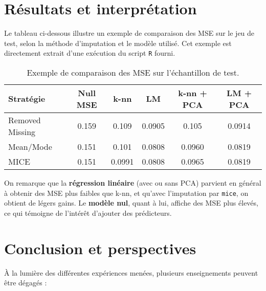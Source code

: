 \documentclass[11pt]{article}
\begin{document}
	
	\section{Résultats et interprétation}
	Le tableau ci-dessous illustre un exemple de comparaison des MSE sur le jeu de test, selon la méthode d'imputation et le modèle utilisé. Cet exemple est directement extrait d'une exécution du script \texttt{R} fourni.
	
	\begin{table}[H]
		\centering
		\begin{tabular}{@{}lccccc@{}}
			\toprule
			\textbf{Stratégie} & \textbf{Null MSE} & \textbf{k-nn} & \textbf{LM} & \textbf{k-nn + PCA} & \textbf{LM + PCA}\\
			\midrule
			Removed Missing  & 0.159 & 0.109 & 0.0905 & 0.105 & 0.0914 \\
			Mean/Mode        & 0.151 & 0.101 & 0.0808 & 0.0960 & 0.0819 \\
			MICE             & 0.151 & 0.0991 & 0.0808 & 0.0965 & 0.0819 \\
			\bottomrule
		\end{tabular}
		\caption{Exemple de comparaison des MSE sur l'échantillon de test.}
		\label{tab:mse_results}
	\end{table}
	
	On remarque que la \textbf{régression linéaire} (avec ou sans PCA) parvient en général à obtenir des MSE plus faibles que k-nn, et qu'avec l'imputation par \texttt{mice}, on obtient de légers gains. Le \textbf{modèle nul}, quant à lui, affiche des MSE plus élevés, ce qui témoigne de l'intérêt d'ajouter des prédicteurs.
	
\section{Conclusion et perspectives}

À la lumière des différentes expériences menées, plusieurs enseignements peuvent être dégagés :
\end{document}
